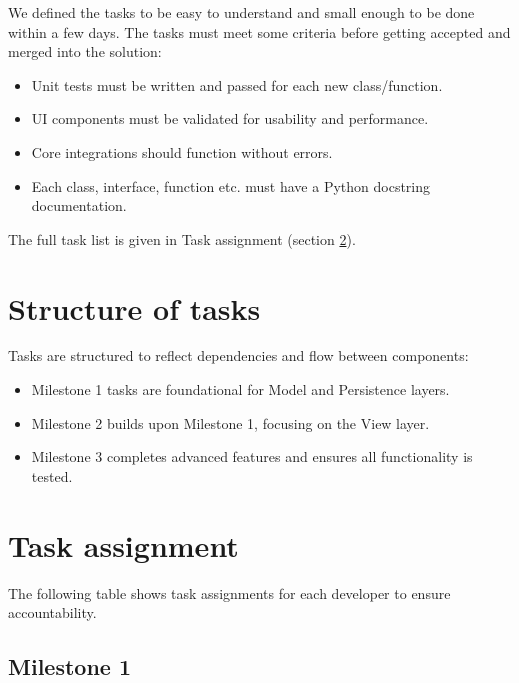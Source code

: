 \documentclass{article}
\begin{document}
We defined the tasks to be easy to understand and small enough to be done within a few days. The tasks must meet some criteria before getting accepted and merged into the solution:

\begin{itemize}
    \item Unit tests must be written and passed for each new class/function.
    \item UI components must be validated for usability and performance.
    \item Core integrations should function without errors.
    \item Each class, interface, function etc. must have a Python docstring documentation.
\end{itemize}

The full task list is given in Task assignment (section \ref{taskassignment}).

\section{Structure of tasks}

Tasks are structured to reflect dependencies and flow between components:

\begin{itemize}
    \item Milestone 1 tasks are foundational for Model and Persistence layers.
    \item Milestone 2 builds upon Milestone 1, focusing on the View layer.
    \item Milestone 3 completes advanced features and ensures all functionality is tested.
\end{itemize}

\newpage

\section{Task assignment}
\label{taskassignment}

The following table shows task assignments for each developer to ensure accountability.

\subsection{Milestone 1}
\end{document}
